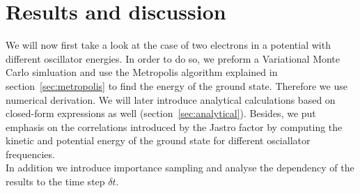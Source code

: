 \section{Results and discussion}
We will now first take a look at the case of two electrons in a potential with different oscillator energies. In order to do so, we preform a Variational Monte Carlo simluation and use the Metropolis algorithm explained in section~\ref{sec:metropolis} to find the energy of the ground state. Therefore we use numerical derivation. We will later introduce analytical calculations based on closed-form expressions as well (section~\ref{sec:analytical}). Besides, we put emphasis on the correlations introduced by the Jastro factor by computing the kinetic and potential energy of the ground state for different osciallator frequencies.\\
In addition we introduce importance sampling and analyse the dependency of the results to the time step $\delta t$.\\
